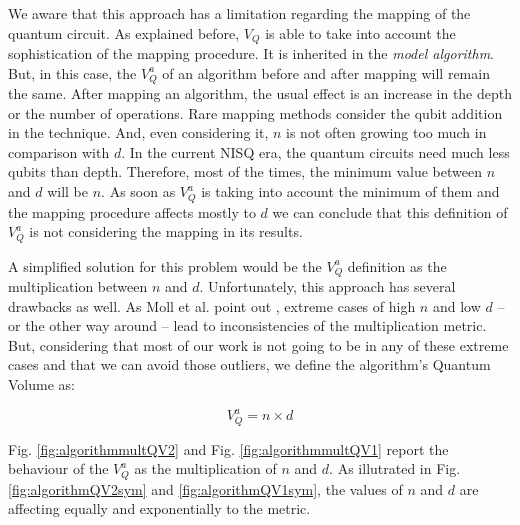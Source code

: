 \documentclass[11pt]{article}
\begin{document}
We aware that this approach has a limitation regarding the mapping of the quantum circuit.
As explained before, \(V_Q\) is able to take into account the sophistication of the mapping procedure.
It is inherited in the \emph{model algorithm}.
But, in this case, the \(V^a_Q\) of an algorithm before and after mapping will remain the same.
After mapping an algorithm, the usual effect is an increase in the depth or the number of operations.
Rare mapping methods consider the qubit addition in the technique.
And, even considering it, \(n\) is not often growing too much in comparison with \(d\).
In the current NISQ era, the quantum circuits need much less qubits than depth.
Therefore, most of the times, the minimum value between \(n\) and \(d\) will be \(n\).
As soon as \(V^a_Q\) is taking into account the minimum of them and the mapping procedure affects mostly to \(d\) we can conclude that this definition of \(V^a_Q\) is not considering the mapping in its results.

A simplified solution for this problem would be the \(V^a_Q\) definition as the multiplication between \(n\) and \(d\).
Unfortunately, this approach has several drawbacks as well.
As Moll et al. point out \cite{Moll_2018}, extreme cases of high \(n\) and low \(d\) -- or the other way around -- lead to inconsistencies of the multiplication metric.
But, considering that most of our work is not going to be in any of these extreme cases and that we can avoid those outliers, we define the algorithm's Quantum Volume as:

$$V_Q^a =  n \times d$$

Fig. \ref{fig:algorithmmultQV2} and Fig. \ref{fig:algorithmmultQV1} report the behaviour of the \(V_Q^a\) as
the multiplication of \(n\) and \(d\).
As illutrated in Fig. \ref{fig:algorithmQV2sym} and \ref{fig:algorithmQV1sym}, the values of \(n\) and \(d\) are
affecting equally and exponentially to the metric.

\end{document}
